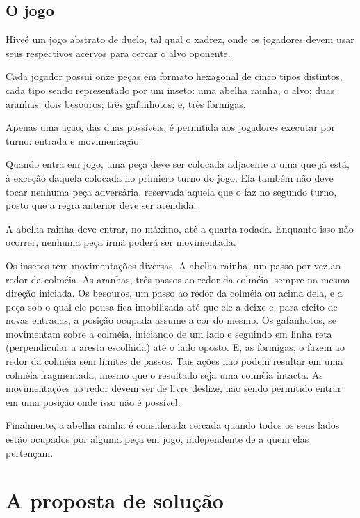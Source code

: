   \subsection{O jogo}

    Hive\footnotemark é um jogo abstrato de duelo, tal qual o xadrez, onde os jogadores devem usar seus respectivos acervos para cercar o alvo oponente.

    Cada jogador possui onze peças em formato hexagonal de cinco tipos distintos, cada tipo sendo representado por um inseto: uma abelha rainha, o alvo; duas aranhas; dois besouros; três gafanhotos; e, três formigas.

    Apenas uma ação, das duas possíveis, é permitida aos jogadores executar por turno: entrada e movimentação.

    Quando entra em jogo, uma peça deve ser colocada adjacente a uma que já está, à exceção daquela colocada no primiero turno do jogo. Ela também não deve tocar nenhuma peça adversária, reservada aquela que o faz no segundo turno, posto que a regra anterior deve ser atendida.

    A abelha rainha deve entrar, no máximo, até a quarta rodada. Enquanto isso não ocorrer, nenhuma peça irmã poderá ser movimentada.

    Os insetos tem movimentações diversas. A abelha rainha, um passo por vez ao redor da colméia. As aranhas, três passos ao redor da colméia, sempre na mesma direção iniciada. Os besouros, um passo ao redor da colméia ou acima dela, e a peça sob o qual ele pousa fica imobilizada até que ele a deixe e, para efeito de novas entradas, a posição ocupada assume a cor do mesmo. Os gafanhotos, se movimentam sobre a colméia, iniciando de um lado e seguindo em linha reta (perpendicular a aresta escolhida) até o lado oposto. E,  as formigas, o fazem ao redor da colméia sem limites de passos. Tais ações não podem resultar em uma colméia fragmentada, mesmo que o resultado seja uma colméia intacta. As movimentações ao redor devem ser de livre deslize, não sendo permitido entrar em uma posição onde isso não é possível.

    Finalmente, a abelha rainha é considerada cercada quando todos os seus lados estão ocupados por alguma peça em jogo, independente de a quem elas pertençam.

\section{A proposta de solução}


